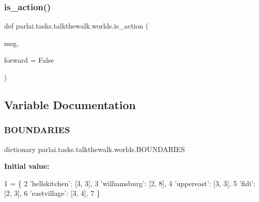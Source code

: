 \subsubsection{\texorpdfstring{is\+\_\+action()}{is\_action()}}
{\footnotesize\ttfamily def parlai.\+tasks.\+talkthewalk.\+worlds.\+is\+\_\+action (\begin{DoxyParamCaption}\item[{}]{msg,  }\item[{}]{forward = {\ttfamily False} }\end{DoxyParamCaption})}



\subsection{Variable Documentation}
\mbox{\label{namespaceparlai_1_1tasks_1_1talkthewalk_1_1worlds_a9fdf0043ff89ba3cc64a6afd08305efe}} 
\subsubsection{\texorpdfstring{B\+O\+U\+N\+D\+A\+R\+I\+ES}{BOUNDARIES}}
{\footnotesize\ttfamily dictionary parlai.\+tasks.\+talkthewalk.\+worlds.\+B\+O\+U\+N\+D\+A\+R\+I\+ES}

{\bfseries Initial value\+:}
\begin{DoxyCode}
1 =  \{
2     \textcolor{stringliteral}{'hellskitchen'}: [3, 3],
3     \textcolor{stringliteral}{'williamsburg'}: [2, 8],
4     \textcolor{stringliteral}{'uppereast'}: [3, 3],
5     \textcolor{stringliteral}{'fidi'}: [2, 3],
6     \textcolor{stringliteral}{'eastvillage'}: [3, 4],
7 \}
\end{DoxyCode}
